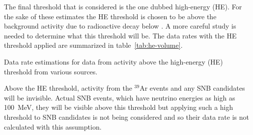 The final threshold that is considered is the one dubbed high-energy (HE).
For the sake of these estimates the HE threshold is chosen to be above
the background activity due to radioactive decay below \chargehethreshold.
A more careful study is needed to determine what this threshold will be.
The data rates with the HE threshold applied are summarized in table~\ref{tab:he-volume}.

\begin{table}[htbp]
  \centering
  \caption{Data rate estimations for data from activity above the
    high-energy (HE) threshold from various sources.}
  
  \label{tab:he-volume}
\end{table}

Above the HE threshold, activity from the $^{39}$Ar events and any SNB
candidates will be invisible.
Actual SNB events, which have neutrino energies as high as
\SI{100}{\MeV}, they will be visible above this threshold but applying
such a high threshold to SNB candidates is not being considered and so
their data rate is not calculated with this assumption.




